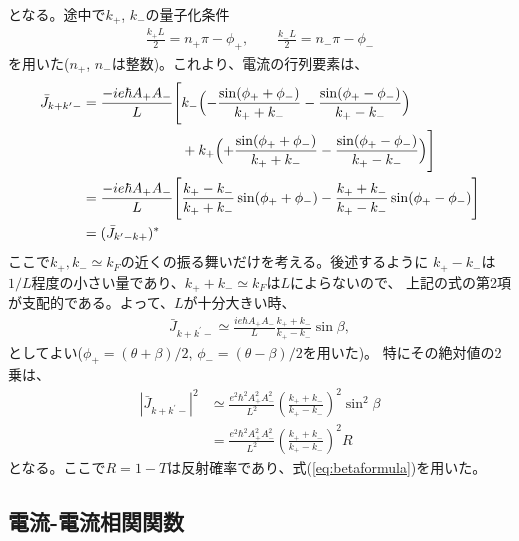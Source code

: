 \documentclass[10pt,a4j]{jarticle}
\begin{document}
となる。途中で$k_+$, $k_-$の量子化条件
\begin{align}
\frac{k_+ L}{2} = n_+ \pi - \phi_+, \quad \quad \frac{k_- L}{2} = n_- \pi - \phi_-
\end{align}
を用いた($n_+$, $n_-$は整数)。これより、電流の行列要素は、
\begin{align}
\bar{J}_{k+ k^\prime -} 
& = \frac{-ie\hbar A_+ A_-}{L} \Biggl[
k_- \Bigl(- \frac{\sin(\phi_+ + \phi_-)}{k_+ + k_-}- \frac{\sin(\phi_+ - \phi_-)}{k_+ - k_-}\Bigr) \nonumber \\
& \hspace{25mm} + k_+ \Bigl(+ \frac{\sin(\phi_+ + \phi_-)}{k_+ + k_-} - \frac{\sin(\phi_+ - \phi_-)}{k_+ - k_-} 
\Bigr) \Biggr] \nonumber \\
&= \frac{-ie\hbar A_+ A_-}{L} \Biggl[
\frac{k_+ - k_-}{k_+ + k_-} \sin(\phi_+ + \phi_-)
- \frac{k_+ + k_-}{k_+ - k_-} \sin(\phi_+ - \phi_-)\Biggr] \nonumber \\
& = (\bar{J}_{k^\prime- k+} )^*
\end{align}
ここで$k_+ , k_- \simeq k_F$の近くの振る舞いだけを考える。後述するように
$k_+ - k_-$は$1/L$程度の小さい量であり、$k_+ + k_- \simeq k_F$は$L$によらないので、
上記の式の第2項が支配的である。よって、$L$が十分大きい時、
\begin{align}
\bar{J}_{k+ k^\prime -} \simeq \frac{ie\hbar A_+ A_-}{L} \frac{k_+ + k_-}{k_+ - k_-} \sin \beta ,
\end{align}
としてよい($\phi_+ =(\theta +\beta)/2$, $\phi_- = (\theta - \beta)/2$を用いた)。
特にその絶対値の2乗は、
\begin{align}
|\bar{J}_{k+ k^\prime -}|^2 &\simeq \frac{e^2 \hbar^2 A_+^2 A_-^2}{L^2} 
\left( \frac{k_+ + k_-}{k_+ - k_-} \right)^2 \sin^2 \beta \nonumber \\
&= \frac{e^2 \hbar^2 A_+^2 A_-^2}{L^2} 
\left(\frac{k_+ + k_-}{k_+ - k_-}\right)^2 R
\label{eq:Japprox}
\end{align}
となる。ここで$R = 1 -T$は反射確率であり、式(\ref{eq:betaformula})を用いた。

\subsection{電流-電流相関関数}
\end{document}
